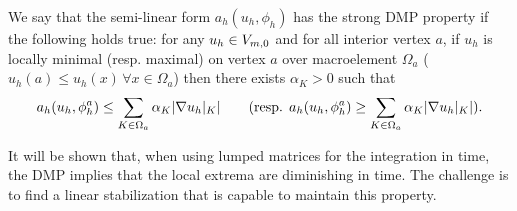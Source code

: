 \begin{definition} \label{strongDMP}
We say that the semi-linear form $a_h(u_h,\phi_h)$ has the strong DMP property if the following holds true: for any $u_h \in V_{m,0}$ and for all interior vertex $a$, if $u_h$ is locally minimal (resp. maximal) on vertex $a$ over macroelement  $\Omega_a$ ($u_h(a)\leq u_h(x) \, \forall x\in \Omega_a$) then there exists $\alpha_K> 0$ such that
\begin{equation*}
a_h(u_h,\phi^a_h) \leq \sum_{K\in \Omega_a} \alpha_K |\nabla u_h |_K | \qquad \hbox{(resp. } a_h(u_h,\phi^a_h) \geq  \sum_{K\in \Omega_a} \alpha_K |\nabla u_h |_K | \hbox{)}.
\end{equation*}
\end{definition}
It will be shown that, when using lumped matrices for the integration in time, the DMP implies that the local extrema are diminishing in time. The challenge is to find a linear stabilization that is capable to maintain this property. %

